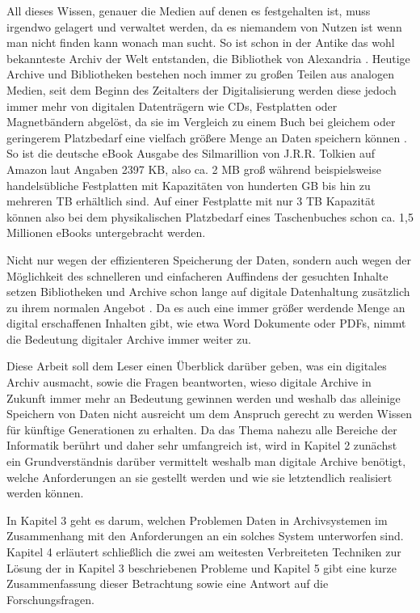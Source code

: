 \documentclass[conference,compsoc,final,a4paper]{IEEEtran}
\begin{document}
All dieses Wissen, genauer die Medien auf denen es festgehalten ist, muss irgendwo gelagert und verwaltet werden, da es niemandem von Nutzen ist wenn man nicht finden kann wonach man sucht. So ist schon in der Antike das wohl bekannteste Archiv der Welt entstanden, die Bibliothek von Alexandria \autocite{BibAlexAntike}. Heutige Archive und Bibliotheken bestehen noch immer zu großen Teilen aus analogen Medien, seit dem Beginn des Zeitalters der Digitalisierung werden diese jedoch immer mehr von digitalen Datenträgern wie CDs, Festplatten oder Magnetbändern abgelöst, da sie im Vergleich zu einem Buch bei gleichem oder geringerem Platzbedarf eine vielfach größere Menge an Daten speichern können \autocite{KLA2015}. So ist die deutsche eBook Ausgabe des Silmarillion von J.R.R. Tolkien auf Amazon laut Angaben 2397 \ac{KB}, also ca. 2 \ac{MB} groß während beispielsweise handelsübliche Festplatten mit Kapazitäten von hunderten \ac{GB} bis hin zu mehreren \ac{TB} erhältlich sind. Auf einer Festplatte mit nur 3 \ac{TB} Kapazität können also bei dem physikalischen Platzbedarf eines Taschenbuches schon ca. 1,5 Millionen eBooks untergebracht werden.

Nicht nur wegen der effizienteren Speicherung der Daten, sondern auch wegen der Möglichkeit des schnelleren und einfacheren Auffindens der gesuchten Inhalte setzen Bibliotheken und Archive schon lange auf digitale Datenhaltung zusätzlich zu ihrem normalen Angebot \autocite{KLA2015}. Da es auch eine immer größer werdende Menge an digital erschaffenen Inhalten gibt, wie etwa Word Dokumente oder \acs{PDF}s, nimmt die Bedeutung digitaler Archive immer weiter zu.

Diese Arbeit soll dem Leser einen Überblick darüber geben, was ein digitales Archiv ausmacht, sowie die Fragen beantworten, wieso digitale Archive in Zukunft immer mehr an Bedeutung gewinnen werden und weshalb das alleinige Speichern von Daten nicht ausreicht um dem Anspruch gerecht zu werden Wissen für künftige Generationen zu erhalten. Da das Thema nahezu alle Bereiche der Informatik berührt und daher sehr umfangreich ist, wird in Kapitel 2 zunächst ein Grundverständnis darüber vermittelt weshalb man digitale Archive benötigt, welche Anforderungen an sie gestellt werden und wie sie letztendlich realisiert werden können.

In Kapitel 3 geht es darum, welchen Problemen Daten in Archivsystemen im Zusammenhang mit den Anforderungen an ein solches System unterworfen sind. Kapitel 4 erläutert schließlich die zwei am weitesten Verbreiteten Techniken zur Lösung der in Kapitel 3 beschriebenen Probleme und Kapitel 5 gibt eine kurze Zusammenfassung dieser Betrachtung sowie eine Antwort auf die Forschungsfragen.
\end{document}
